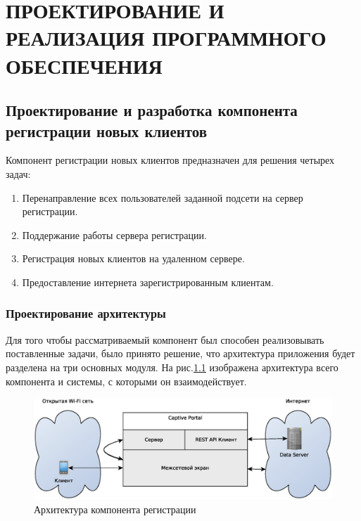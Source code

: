 \chapter{ПРОЕКТИРОВАНИЕ И РЕАЛИЗАЦИЯ ПРОГРАММНОГО ОБЕСПЕЧЕНИЯ}

\section{Проектирование и разработка компонента регистрации новых клиентов}

Компонент регистрации новых клиентов предназначен для решения четырех задач:

\begin{enumerate}
	\item Перенаправление всех пользователей заданной подсети на сервер регистрации.
	\item Поддержание работы сервера регистрации.
	\item Регистрация новых клиентов на удаленном сервере.
	\item Предоставление интернета зарегистрированным клиентам.
\end{enumerate}

\subsection{Проектирование архитектуры}

Для того чтобы рассматриваемый компонент был способен реализовывать поставленные задачи, было принято решение, что архитектура приложения будет разделена на три основных модуля. На рис.\ref{fig:CPArchitecture} изображена архитектура всего компонента и системы, с которыми он взаимодействует.

\begin{figure}[H]
	\centering
	\includegraphics[width=\linewidth]{fig/CPArchitecture}
	\caption{Архитектура компонента регистрации}
	\label{fig:CPArchitecture}
\end{figure}

